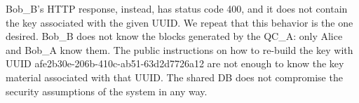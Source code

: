 Bob\_B's HTTP response, instead, has status code 400, and it does not contain the key associated with the given UUID. We repeat that this behavior is the one desired. Bob\_B does not know the blocks generated by the QC\_A: only Alice and Bob\_A know them. The public instructions on how to re-build the key with UUID afe2b30e-206b-410c-ab51-63d2d7726a12 are not enough to know the key material associated with that UUID. The shared DB does not compromise the security assumptions of the system in any way.